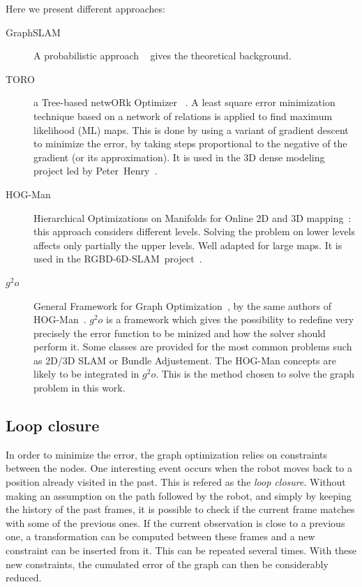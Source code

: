 Here we present different approaches:

\begin{description}
\item[GraphSLAM] A probabilistic approach ~\cite{Thrun_2005} gives the theoretical background. %
\item[TORO] a Tree-based netwORk Optimizer ~\cite{grisetti07rss}. A least square error minimization technique based on a network of relations is applied to find maximum likelihood (ML) maps. This is done by using a variant of gradient descent to minimize the error, by taking steps proportional to the negative of the gradient (or its approximation). It is used in the 3D dense modeling project led by Peter~Henry~\cite{Intel_RGBD_2010}.
\item[HOG-Man] Hierarchical Optimizations on Manifolds for Online 2D and 3D mapping~\cite{hogman_2010}: this approach considers different levels. Solving the problem on lower levels affects only partially the upper levels. Well adapted for large maps. It is used in the RGBD-6D-SLAM~project~\cite{engelhard11euron-workshop}.
\item[$g^2o$] General Framework for Graph Optimization~\cite{g2o_2011}, by the same authors of HOG-Man~\cite{hogman_2010}. $g^2o$ is a framework which gives the possibility to redefine very precisely the error function to be minized and how the solver should perform it. Some classes are provided for the most common problems such as 2D/3D \gls{SLAM} or Bundle Adjustement. The HOG-Man concepts are likely to be integrated in $g^2o$. This is the method chosen to solve the graph problem in this work.
\end{description}

\subsection{Loop closure}

In order to minimize the error, the graph optimization relies on constraints between the nodes. One interesting event occurs when the robot moves back to a position already visited in the past. This is refered as the \emph{loop closure}. Without making an assumption on the path followed by the robot, and simply by keeping the history of the past frames, it is possible to check if the current frame matches with some of the previous ones. If the current observation is close to a previous one, a transformation can be computed between these frames and a new constraint can be inserted from it. This can be repeated several times. With these new constraints, the cumulated error of the graph can then be considerably reduced. 

